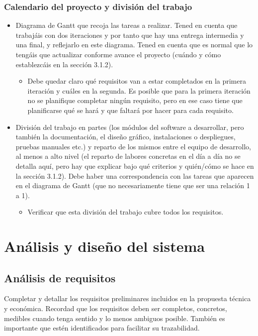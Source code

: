 \documentclass[12pt]{article}%
\begin{document}
\subsubsection{Calendario del proyecto y divisi\'on del trabajo}
\begin{itemize}
	\item Diagrama de Gantt que recoja las tareas a realizar. Tened en cuenta que trabaj\'ais con dos iteraciones y por tanto que hay una entrega intermedia y una final, y reflejarlo en este diagrama. Tened en cuenta que es normal que lo teng\'ais que actualizar conforme avance el proyecto (cu\'ando y c\'omo establezc\'ais en la secci\'on 3.1.2).
	\begin{itemize}
		\item Debe quedar claro qu\'e requisitos van a estar completados en la primera iteraci\'on y cu\'ales en la segunda. Es posible que para la primera iteraci\'on no se planifique completar ning\'un requisito, pero en ese caso tiene que planificarse qu\'e se har\'a y que faltar\'a por hacer para cada requisito.
	\end{itemize}
	\item Divisi\'on del trabajo en partes (los m\'odulos del software a desarrollar, pero tambi\'en  la documentaci\'on, el dise\~no gr\'afico, instalaciones o despliegues, pruebas manuales etc.) y reparto de los mismos entre el equipo de desarrollo, al menos a alto nivel (el reparto de labores concretas en el d\'ia a d\'ia no se detalla aqu\'i, pero hay que explicar bajo qu\'e criterios y qui\'en/c\'omo se hace en la secci\'on 3.1.2). Debe haber una correspondencia con las tareas que aparecen en el diagrama de Gantt (que no necesariamente tiene que ser una relaci\'on 1 a 1).
	\begin{itemize}
		\item Verificar que esta divisi\'on del trabajo cubre todos los requisitos.
	\end{itemize}
\end{itemize}



\section{An\'alisis y dise\~no del sistema} %

\subsection{An\'alisis de requisitos}
Completar y detallar los requisitos preliminares incluidos en la propuesta t\'ecnica y econ\'omica. Recordad que los requisitos deben ser completos, concretos, medibles cuando tenga sentido y lo menos ambiguos posible. Tambi\'en es importante que est\'en identificados para facilitar su trazabilidad.
\end{document}

